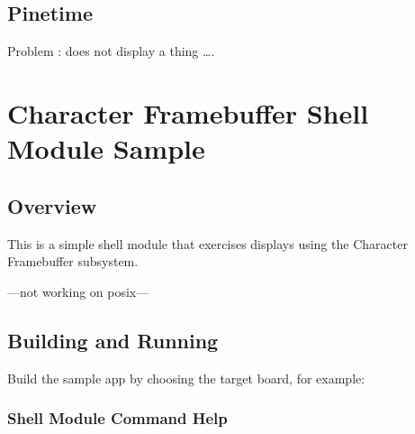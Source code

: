 \documentclass[letterpaper,10pt,english]{sphinxmanual}
\begin{document}
\subsection{Pinetime}
\label{\detokenize{samples/samplescfbREADME:pinetime}}
Problem : does not display a thing ….


\section{Character Framebuffer Shell Module Sample}
\label{\detokenize{samples/samplescfb_shellREADME:character-framebuffer-shell-module-sample}}\label{\detokenize{samples/samplescfb_shellREADME:cfb-shell-sample}}\label{\detokenize{samples/samplescfb_shellREADME::doc}}

\subsection{Overview}
\label{\detokenize{samples/samplescfb_shellREADME:overview}}
This is a simple shell module that exercises displays using the Character
Framebuffer subsystem.

—not working on posix—\textendash{}


\subsection{Building and Running}
\label{\detokenize{samples/samplescfb_shellREADME:building-and-running}}
Build the sample app by choosing the target board, for example:


\subsubsection{Shell Module Command Help}
\label{\detokenize{samples/samplescfb_shellREADME:shell-module-command-help}}
\begin{sphinxVerbatim}[commandchars=\\\{\}]
\end{sphinxVerbatim}
\end{document}
